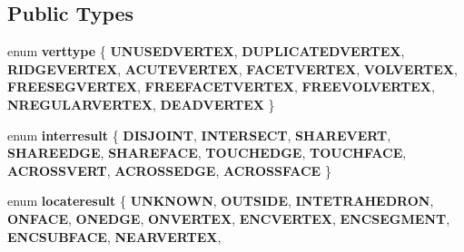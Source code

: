 \subsection*{Public Types}
\begin{DoxyCompactItemize}
\item 
\mbox{\label{classtetgenmesh_ad0458f823a5eef2de89c7fae067aa2ac}} 
enum {\bfseries verttype} \{ \newline
{\bfseries U\+N\+U\+S\+E\+D\+V\+E\+R\+T\+EX}, 
{\bfseries D\+U\+P\+L\+I\+C\+A\+T\+E\+D\+V\+E\+R\+T\+EX}, 
{\bfseries R\+I\+D\+G\+E\+V\+E\+R\+T\+EX}, 
{\bfseries A\+C\+U\+T\+E\+V\+E\+R\+T\+EX}, 
\newline
{\bfseries F\+A\+C\+E\+T\+V\+E\+R\+T\+EX}, 
{\bfseries V\+O\+L\+V\+E\+R\+T\+EX}, 
{\bfseries F\+R\+E\+E\+S\+E\+G\+V\+E\+R\+T\+EX}, 
{\bfseries F\+R\+E\+E\+F\+A\+C\+E\+T\+V\+E\+R\+T\+EX}, 
\newline
{\bfseries F\+R\+E\+E\+V\+O\+L\+V\+E\+R\+T\+EX}, 
{\bfseries N\+R\+E\+G\+U\+L\+A\+R\+V\+E\+R\+T\+EX}, 
{\bfseries D\+E\+A\+D\+V\+E\+R\+T\+EX}
 \}
\item 
\mbox{\label{classtetgenmesh_a01d2be902350e1bf8f20e650d687a793}} 
enum {\bfseries interresult} \{ \newline
{\bfseries D\+I\+S\+J\+O\+I\+NT}, 
{\bfseries I\+N\+T\+E\+R\+S\+E\+CT}, 
{\bfseries S\+H\+A\+R\+E\+V\+E\+RT}, 
{\bfseries S\+H\+A\+R\+E\+E\+D\+GE}, 
\newline
{\bfseries S\+H\+A\+R\+E\+F\+A\+CE}, 
{\bfseries T\+O\+U\+C\+H\+E\+D\+GE}, 
{\bfseries T\+O\+U\+C\+H\+F\+A\+CE}, 
{\bfseries A\+C\+R\+O\+S\+S\+V\+E\+RT}, 
\newline
{\bfseries A\+C\+R\+O\+S\+S\+E\+D\+GE}, 
{\bfseries A\+C\+R\+O\+S\+S\+F\+A\+CE}
 \}
\item 
\mbox{\label{classtetgenmesh_a1d02bed7b59566d57b896776d78a6b25}} 
enum {\bfseries locateresult} \{ \newline
{\bfseries U\+N\+K\+N\+O\+WN}, 
{\bfseries O\+U\+T\+S\+I\+DE}, 
{\bfseries I\+N\+T\+E\+T\+R\+A\+H\+E\+D\+R\+ON}, 
{\bfseries O\+N\+F\+A\+CE}, 
\newline
{\bfseries O\+N\+E\+D\+GE}, 
{\bfseries O\+N\+V\+E\+R\+T\+EX}, 
{\bfseries E\+N\+C\+V\+E\+R\+T\+EX}, 
{\bfseries E\+N\+C\+S\+E\+G\+M\+E\+NT}, 
\newline
{\bfseries E\+N\+C\+S\+U\+B\+F\+A\+CE}, 
{\bfseries N\+E\+A\+R\+V\+E\+R\+T\+EX}, 

\end{DoxyCompactItemize}
